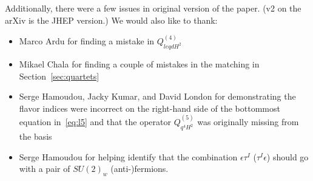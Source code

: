 \documentclass[11pt,a4paper]{article}
\begin{document}
Additionally, there were a few issues in original version of the paper.
(v2 on the arXiv is the JHEP version.)
We would also like to thank:
\begin{itemize}
\item [v3] Marco Ardu for finding a mistake in $Q_{leqdH^2}^{(4)}$
\item [v4] Mikael Chala for finding a couple of mistakes in the matching in Section~\ref{sec:quartets}
\item [v5] Serge Hamoudou, Jacky Kumar, and David London for demonstrating the flavor indices were incorrect on the right-hand side of the bottommost equation in~\eqref{eq:l5} and that the operator $Q_{q^4H^2}^{(5)}$ was originally missing from the basis
\item [v6] Serge Hamoudou for helping identify that the combination $\epsilon \tau^I$ ($\tau^I \epsilon$) should go with a pair of $SU(2)_w$ (anti-)fermions.
\end{itemize}



\begin{appendix}




\end{appendix}

\clearpage





\end{document}
